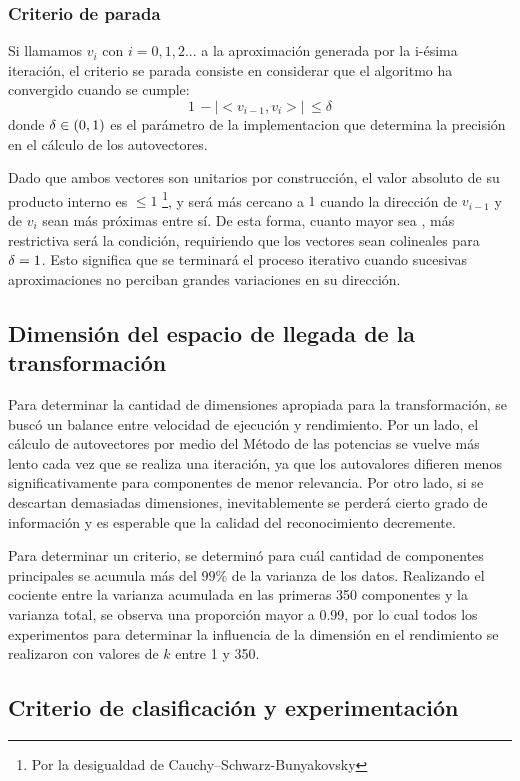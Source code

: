 \subsubsection{Criterio de parada}

Si llamamos $v_i$ con $i = 0, 1, 2 ...$ a la aproximación generada por la i-ésima iteración, el criterio se parada consiste en considerar que el algoritmo ha convergido cuando se cumple:
$$ 1\, - \left | <v_{i-1}, v_{i}> \right | \, \leq \delta $$
donde $\delta \in \left ( 0, 1 \right )$ es el parámetro de la implementacion que determina la precisión en el cálculo de los autovectores.

Dado que ambos vectores son unitarios por construcción, el valor absoluto de su producto interno es $\leq 1$ \footnote{Por la desigualdad de Cauchy–Schwarz-Bunyakovsky}, y será más cercano a $1$ cuando la dirección de $v_{i-1}$ y de $v_{i}$ sean más próximas entre sí. De esta forma, cuanto mayor sea \delt, más restrictiva será la condición, requiriendo que los vectores sean colineales para $\delta = 1$. Esto significa que se terminará el proceso iterativo cuando sucesivas aproximaciones no perciban grandes variaciones en su dirección.

\subsection{Dimensión del espacio de llegada de la transformación}

Para determinar la cantidad de dimensiones apropiada para la transformación, se buscó un balance entre velocidad de ejecución y rendimiento. Por un lado, el cálculo de autovectores por medio del Método de las potencias se vuelve más lento cada vez que se realiza una iteración, ya que los autovalores difieren menos significativamente para componentes de menor relevancia. Por otro lado, si se descartan demasiadas dimensiones, inevitablemente se perderá cierto grado de información y es esperable que la calidad del reconocimiento decremente.

Para determinar un criterio, se determinó para cuál cantidad de componentes principales se acumula más del $99\%$ de la varianza de los datos. Realizando el cociente entre la varianza acumulada en las primeras 350 componentes y la varianza total, se observa una proporción mayor a 0.99, por lo cual todos los experimentos para determinar la influencia de la dimensión en el rendimiento se realizaron con valores de $k$ entre 1 y 350.

\subsection{Criterio de clasificación y experimentación}

